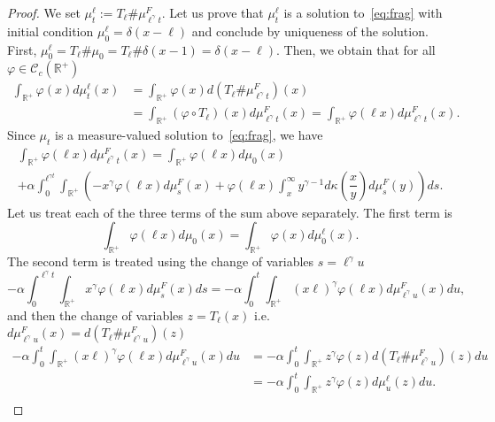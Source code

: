 \documentclass[10pt,a4paper]{amsart}
\numberwithin{equation}{section}
\newcommand*\dst{\displaystyle}
\renewcommand*\a{\alpha}
\newcommand*\R{\mathbb{R}}
\newcommand{\clC}{\mathcal{C}}
\begin{document}
\begin{proof}
We set $\mu_t^{\ell}:= T_{\ell} \# \mu_{\ell^{\gamma}t}^{F}$. Let us prove that $\mu_t^{\ell}$ is a solution to~\eqref{eq:frag} with initial condition $\mu_0^{\ell}=\delta(x-\ell)$ and conclude by uniqueness of the solution. First, $\mu_0^{\ell} = T_{\ell}\# \mu_0 = T_{\ell}\# \delta(x-1) =\delta(x-\ell)$. Then, we obtain that for all $\varphi\in \clC_c(\R^+)$
\begin{align*}
\dst\int_{\R^+} \varphi(x) d\mu_t^{\ell}(x) &= \dst\int_{\R^+} \varphi(x) d\left(T_{\ell}\# \mu_{\ell^{\gamma}t}^{F}\right)(x) \\
&= \dst\int_{\R^+} (\varphi\circ T_{\ell})(x) d \mu_{\ell^{\gamma}t}^{F}(x) = \dst\int_{\R^+} \varphi(\ell x) d \mu_{\ell^{\gamma}t}^{F}(x).
\end{align*}
Since $\mu_t$ is a measure-valued solution to~\eqref{eq:frag}, we have
\begin{multline*}
\dst\int_{\R^+} \varphi(\ell x) d \mu_{\ell^{\gamma}t}^{F}(x)
=
\int_{\R^+} \varphi(\ell x) d\mu_0(x)\\
+\a \dst\int_0^{\ell^{\gamma t}} \dst\int_{\R^+}
\left(-x^{\gamma} \varphi(\ell x)d\mu_s^{F}(x)+ \varphi(\ell x)\dst\int_x^{\infty}y^{\gamma-1} d\kappa\left(\dfrac{x}{y}\right)d\mu_s^{F}(y)\right)ds.
\end{multline*}
Let us treat each of the three terms of the sum above separately. The first term is
\begin{equation*}
\int_{\R^+} \varphi(\ell x) d\mu_0(x) =
\int_{\R^+} \varphi(x) d\mu_0^{\ell}(x).
\end{equation*}
The second term is treated using the change of variables $s=\ell^{\gamma}u$
\begin{equation*}
-\a \dst\int_0^{\ell^{\gamma} t} \dst\int_{\R^+} x^{\gamma} \varphi(\ell x)d\mu_s^{F}(x)ds= -\a \dst\int_0^{t} \dst\int_{\R^+}
\left(x\ell\right)^{\gamma} \varphi(\ell x)d\mu_{\ell^{\gamma}u}^{F}(x)du,
\end{equation*}
and then the change of variables $z=T_{\ell}(x)$ i.e. $d\mu_{\ell^{\gamma}u}^{F}(x)= d(T_{\ell} \#\mu_{\ell^{\gamma}u}^{F})(z)$
\begin{align*}
-\a \dst\int_0^{t} \dst\int_{\R^+}
\left(x\ell\right)^{\gamma} \varphi(\ell x)d\mu_{\ell^{\gamma}u}^{F}(x)du &= -\a \dst\int_0^{t} \dst\int_{\R^+} z^{\gamma} \varphi(z)d\left(T_{\ell} \# \mu_{\ell^{\gamma}u}^{F}\right)(z)du\\
&= -\a \dst\int_0^{t} \dst\int_{\R^+} z^{\gamma} \varphi(z)d\mu_u^{\ell}(z)du.\\

\end{align*}
\end{proof}
\end{document}
